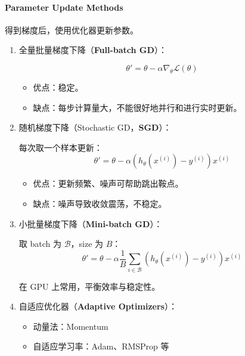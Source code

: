 \paragraph{Parameter Update Methods}\label{parameter-update-methods}

得到梯度后，使用优化器更新参数。

\begin{enumerate}
  \def\labelenumi{\arabic{enumi}.}
  \item
        全量批量梯度下降（\textbf{Full-batch GD}）：

        \[
          \theta' = \theta - \alpha \nabla_\theta \mathcal{L}(\theta)
        \]

        \begin{itemize}
          \tightlist
          \item
                优点：稳定。
          \item
                缺点：每步计算量大，不能很好地并行和进行实时更新。
        \end{itemize}
  \item
        随机梯度下降（Stochastic GD，\textbf{SGD}）：

        每次取一个样本更新： \[
          \theta' = \theta - \alpha (h_\theta(x^{(i)}) - y^{(i)}) x^{(i)}
        \]

        \begin{itemize}
          \tightlist
          \item
                优点：更新频繁、噪声可帮助跳出鞍点。
          \item
                缺点：噪声导致收敛震荡，不稳定。
        \end{itemize}
  \item
        小批量梯度下降（\textbf{Mini-batch GD}）：

        取 batch 为 \(\mathcal{B}\)，size 为 \(B\)： \[
          \theta' = \theta - \alpha \frac{1}{B}\sum_{i\in\mathcal{B}}(h_\theta(x^{(i)})-y^{(i)}) x^{(i)}
        \]

        在 GPU 上常用，平衡效率与稳定性。
  \item
        自适应优化器（\textbf{Adaptive Optimizers}）：

        \begin{itemize}
          \tightlist
          \item
                动量法：Momentum
          \item
                自适应学习率：Adam、RMSProp 等
        \end{itemize}
\end{enumerate}

